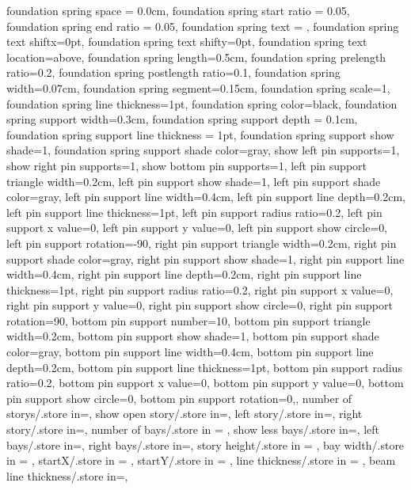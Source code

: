 {{  foundation spring space = 0.0cm,
  foundation spring start ratio = 0.05,
  foundation spring end ratio = 0.05,
  foundation spring text = {},
  foundation spring text shiftx=0pt,
  foundation spring text shifty=0pt,
  foundation spring text location=above,
  foundation spring length=0.5cm,
  foundation spring prelength ratio=0.2,
  foundation spring postlength ratio=0.1,
  foundation spring width=0.07cm,
  foundation spring segment=0.15cm,
  foundation spring scale=1,
  foundation spring line thickness=1pt,
  foundation spring color=black,
  foundation spring support width=0.3cm,
  foundation spring support depth = 0.1cm,
  foundation spring support line thickness = 1pt,
  foundation spring support show shade=1,
  foundation spring support shade color=gray,
  show left pin supports=1,
  show right pin supports=1,
  show bottom pin supports=1,
  left pin support triangle width=0.2cm,
  left pin support show shade=1,
  left pin support shade color=gray,
  left pin support line width=0.4cm,
  left pin support line depth=0.2cm,
  left pin support line thickness=1pt,
  left pin support radius ratio=0.2,
  left pin support x value=0,
  left pin support y value=0,
  left pin support show circle=0,
  left pin support rotation=-90,
  right pin support triangle width=0.2cm,
  right pin support shade color=gray,
  right pin support show shade=1,
  right pin support line width=0.4cm,
  right pin support line depth=0.2cm,
  right pin support line thickness=1pt,
  right pin support radius ratio=0.2,
  right pin support x value=0,
  right pin support y value=0,
  right pin support show circle=0,
  right pin support rotation=90,
  bottom pin support number=10,
  bottom pin support triangle width=0.2cm,
  bottom pin support show shade=1,
  bottom pin support shade color=gray,
  bottom pin support line width=0.4cm,
  bottom pin support line depth=0.2cm,
  bottom pin support line thickness=1pt,
  bottom pin support radius ratio=0.2,
  bottom pin support x value=0,
  bottom pin support y value=0,
  bottom pin support show circle=0,
  bottom pin support rotation=0,},
  number of storys/.store in=\storynumber,
  show open story/.store in=\showopenstory,
  left story/.store in=\leftstory,
  right story/.store in=\rightstory,
  number of bays/.store in = \baynumber,
  show less bays/.store in=\showlessbays,
  left bays/.store in=\leftbays,
  right bays/.store in=\rightbays,
  story height/.store in = \storyheight,
  bay width/.store in = \baywidth,
  startX/.store in = \startx,
  startY/.store in = \starty,
  line thickness/.store in = \linet,
  beam line thickness/.store in=\beamlinet,
}
